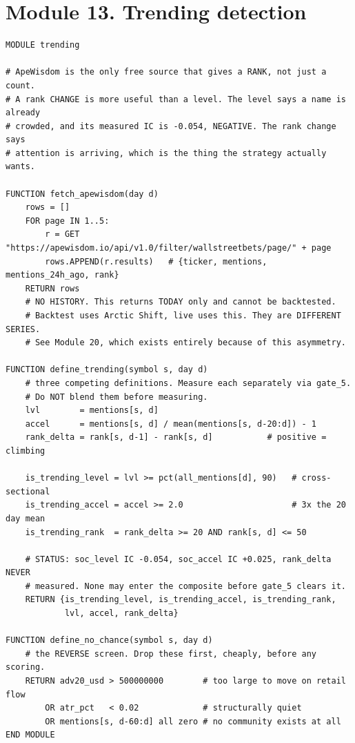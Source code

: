 \documentclass[10pt]{article}
\begin{document}
\section{Module 13. Trending detection}

\begin{lstlisting}
MODULE trending

# ApeWisdom is the only free source that gives a RANK, not just a count.
# A rank CHANGE is more useful than a level. The level says a name is already
# crowded, and its measured IC is -0.054, NEGATIVE. The rank change says
# attention is arriving, which is the thing the strategy actually wants.

FUNCTION fetch_apewisdom(day d)
    rows = []
    FOR page IN 1..5:
        r = GET "https://apewisdom.io/api/v1.0/filter/wallstreetbets/page/" + page
        rows.APPEND(r.results)   # {ticker, mentions, mentions_24h_ago, rank}
    RETURN rows
    # NO HISTORY. This returns TODAY only and cannot be backtested.
    # Backtest uses Arctic Shift, live uses this. They are DIFFERENT SERIES.
    # See Module 20, which exists entirely because of this asymmetry.

FUNCTION define_trending(symbol s, day d)
    # three competing definitions. Measure each separately via gate_5.
    # Do NOT blend them before measuring.
    lvl        = mentions[s, d]
    accel      = mentions[s, d] / mean(mentions[s, d-20:d]) - 1
    rank_delta = rank[s, d-1] - rank[s, d]           # positive = climbing

    is_trending_level = lvl >= pct(all_mentions[d], 90)   # cross-sectional
    is_trending_accel = accel >= 2.0                      # 3x the 20 day mean
    is_trending_rank  = rank_delta >= 20 AND rank[s, d] <= 50

    # STATUS: soc_level IC -0.054, soc_accel IC +0.025, rank_delta NEVER
    # measured. None may enter the composite before gate_5 clears it.
    RETURN {is_trending_level, is_trending_accel, is_trending_rank,
            lvl, accel, rank_delta}

FUNCTION define_no_chance(symbol s, day d)
    # the REVERSE screen. Drop these first, cheaply, before any scoring.
    RETURN adv20_usd > 500000000        # too large to move on retail flow
        OR atr_pct   < 0.02             # structurally quiet
        OR mentions[s, d-60:d] all zero # no community exists at all
END MODULE
\end{lstlisting}
\end{document}

